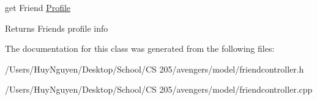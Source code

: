 get Friend \hyperlink{classProfile}{Profile} 

\begin{DoxyReturn}{Returns}
Friend\textquotesingle{}s profile info 
\end{DoxyReturn}


The documentation for this class was generated from the following files\+:\begin{DoxyCompactItemize}
\item 
/\+Users/\+Huy\+Nguyen/\+Desktop/\+School/\+C\+S 205/avengers/model/friendcontroller.\+h\item 
/\+Users/\+Huy\+Nguyen/\+Desktop/\+School/\+C\+S 205/avengers/model/friendcontroller.\+cpp\end{DoxyCompactItemize}
